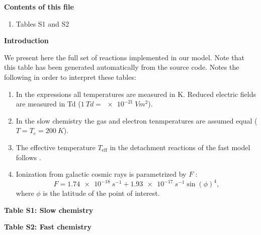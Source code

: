 \documentclass[jgrga,draft]{agutexSI2019}
\begin{document}
\begin{article}

\noindent\textbf{Contents of this file}
\begin{enumerate}
\item Tables S1 and S2
\end{enumerate}

\noindent\textbf{Introduction}

We present here the full set of reactions implemented in our model. Note that this table has been generated automatically from the source code. Notes the following in order to interpret these tables:
\begin{enumerate}
\item In the expressions all temperatures are measured in K. Reduced electric fields are measured in Td
  ($\SI{1}{Td}=\SI{e-21}{Vm^2}$).
\item In the slow chemistry the gas and electron tenmperatures are assumed equal ($T=T_e=\SI{200}{K}$).
\item The effective temperature $T_\text{eff}$ in the detachment reactions of the fast model follows \cite{Malagon-Romero2024/GeoRL/tmp}.
\item Ionization from galactic cosmic rays is parametrized by $F$ \cite{Heaps1978/P&SS}:
  \begin{equation}
        F = \SI{1.74e-18}{s^{-1}} + \SI{1.93e-17}{s^{-1}} \sin(\phi)^4,
  \end{equation}
  where $\phi$ is the latitude of the point of interest.
\end{enumerate}



\clearpage

\noindent\textbf{Table S1: Slow chemistry}
{\small

}

\clearpage

\noindent\textbf{Table S2: Fast chemistry}
{\small

}


% 
%
%
%
%
\newcommand{\newblock}{}




\end{article}
\end{document}
